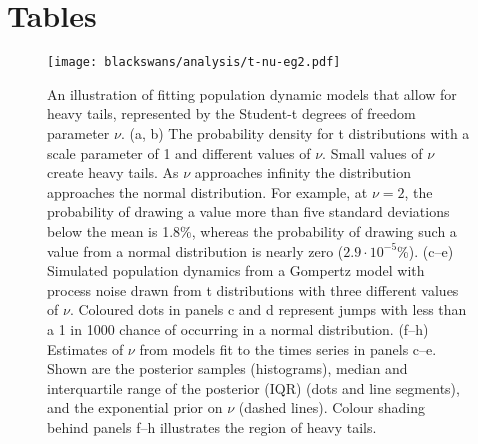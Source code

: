 %
%
% 
% 
%

\section{Tables}



\clearpage

\begin{figure}[htbp]
\begin{center}
\texttt{[image: blackswans/analysis/t-nu-eg2.pdf]}
\caption[An illustration of fitting population dynamic models that allow for heavy
tails, represented by the Student-t degrees of freedom parameter $\nu$.]{
An illustration of fitting population dynamic models that allow for heavy
tails, represented by the Student-t degrees of freedom parameter $\nu$. (a, b)
The probability density for t distributions with a scale parameter of 1 and
different values of $\nu$. Small values of $\nu$ create heavy tails. As $\nu$
approaches infinity the distribution approaches the normal distribution. For
example, at $\nu = 2$, the probability of drawing a value more than five
standard deviations below the mean is 1.8\%, whereas the probability of drawing
such a value from a normal distribution is nearly zero ($2.9\cdot10^{-5}$\%).
(c--e) Simulated population dynamics from a Gompertz model with process noise
drawn from t distributions with three different values of $\nu$. Coloured dots
in panels c and d represent jumps with less than a 1 in 1000 chance of
occurring in a normal distribution. (f--h) Estimates of $\nu$ from models fit
to the times series in panels c--e. Shown are the posterior samples
(histograms), median and interquartile range of the posterior (IQR) (dots and
line segments), and the exponential prior on $\nu$ (dashed lines). Colour
shading behind panels f--h illustrates the region of heavy tails.
}
\label{fig:didactic}
\end{center}
\end{figure}

